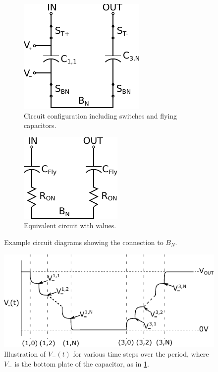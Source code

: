 \documentclass[conference]{IEEEtran}
\begin{document}
	\begin{figure}
		\centering
		\begin{subfigure}{0.4\textwidth}
			\centering
			\includegraphics[width=0.45\linewidth]{Figures/step2_Circ.pdf}
			\caption{Circuit configuration including switches and flying capacitors.}
			\label{fig:step_Circ1}
		\end{subfigure}
		\begin{subfigure}{0.4\textwidth}
			\centering
			\includegraphics[width=0.35\linewidth]{Figures/step2_Eq.pdf}
			\caption{Equivalent circuit with values.}
			\label{fig:step_Circ2}	
	\end{subfigure}
		\caption{Example circuit diagrams showing the connection to $B_N$.}
	\end{figure}

	\begin{figure}
		\centering
		\includegraphics[width=0.9\linewidth]{Figures/V-(t).pdf}
		\caption{Illustration of $V_{-}(t)$ for various time steps over the period, where $V_-$ is the bottom plate of the capacitor, as in \ref{fig:step_Circ1}.}
		\label{fig:V-(t)}
	\end{figure}
	
\end{document}
